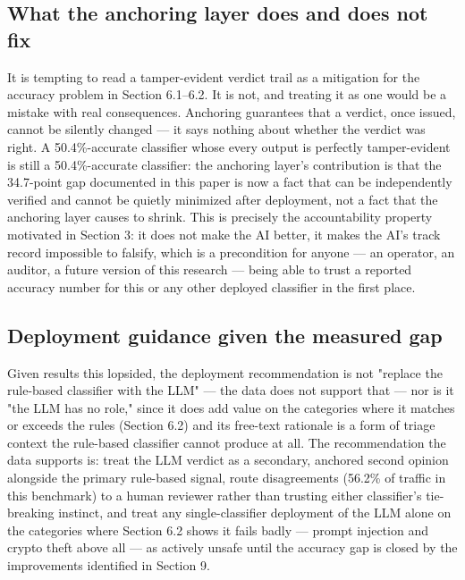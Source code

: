 \documentclass[journal,10pt,twocolumn]{IEEEtran}
\begin{document}
\subsection{What the anchoring layer does and does not fix}

It is tempting to read a tamper-evident verdict trail as a mitigation for the accuracy problem in Section 6.1--6.2. It is not, and treating it as one would be a mistake with real consequences. Anchoring guarantees that a verdict, once issued, cannot be silently changed --- it says nothing about whether the verdict was right. A 50.4\%-accurate classifier whose every output is perfectly tamper-evident is still a 50.4\%-accurate classifier: the anchoring layer's contribution is that the 34.7-point gap documented in this paper is now a fact that can be independently verified and cannot be quietly minimized after deployment, not a fact that the anchoring layer causes to shrink. This is precisely the accountability property motivated in Section 3: it does not make the AI better, it makes the AI's track record impossible to falsify, which is a precondition for anyone --- an operator, an auditor, a future version of this research --- being able to trust a reported accuracy number for this or any other deployed classifier in the first place.

\subsection{Deployment guidance given the measured gap}

Given results this lopsided, the deployment recommendation is not "replace the rule-based classifier with the LLM" --- the data does not support that --- nor is it "the LLM has no role," since it does add value on the categories where it matches or exceeds the rules (Section 6.2) and its free-text rationale is a form of triage context the rule-based classifier cannot produce at all. The recommendation the data supports is: treat the LLM verdict as a secondary, anchored second opinion alongside the primary rule-based signal, route disagreements (56.2\% of traffic in this benchmark) to a human reviewer rather than trusting either classifier's tie-breaking instinct, and treat any single-classifier deployment of the LLM alone on the categories where Section 6.2 shows it fails badly --- prompt injection and crypto theft above all --- as actively unsafe until the accuracy gap is closed by the improvements identified in Section 9.
\end{document}
